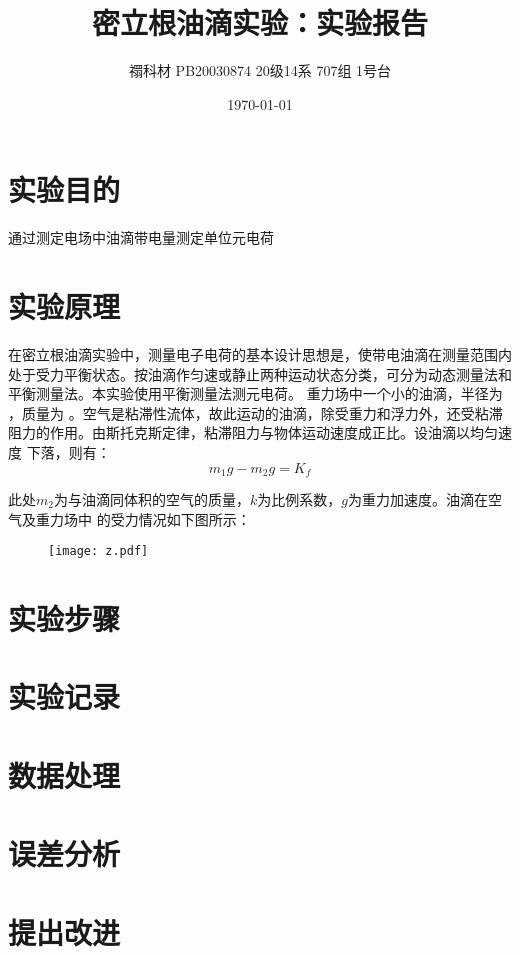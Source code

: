 \documentclass[UTF8]{ctexart}
\title{密立根油滴实验：实验报告}
\author{禤科材 PB20030874 20级14系 707组 1号台}
\date{\today}
\begin{document}
    \maketitle
    \tableofcontents


    \section{实验目的}
    \begin{center}
        通过测定电场中油滴带电量测定单位元电荷
    \end{center}
    \section{实验原理}
    在密立根油滴实验中，测量电子电荷的基本设计思想是，使带电油滴在测量范围内处于受力平衡状态。按油滴作匀速或静止两种运动状态分类，可分为动态测量法和平衡测量法。本实验使用平衡测量法测元电荷。
    重力场中一个小的油滴，半径为 ，质量为 。空气是粘滞性流体，故此运动的油滴，除受重力和浮力外，还受粘滞阻力的作用。由斯托克斯定律，粘滞阻力与物体运动速度成正比。设油滴以均匀速度 下落，则有：
    \begin{equation}
        m_1g-m_2g=K_f
    \end{equation}

    此处$m_2$为与油滴同体积的空气的质量，$k$为比例系数，$g$为重力加速度。油滴在空气及重力场中
    的受力情况如下图所示：
    \begin{figure}[ht]
        \centering 
        \texttt{[image: z.pdf]}
    \end{figure}

    \section{实验步骤}

    \section{实验记录}

    \section{数据处理}
        
    \section{误差分析}

    \section{提出改进}

    \nocite{a}
    \nocite{b}
    \nocite{c}
    \nocite{d}
    
\end{document}
